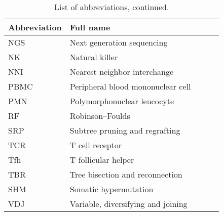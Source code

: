 \vfill

\begin{table}[!ht]
\begin{tabular}{l*{3}{l}r}
	 \textbf{Abbreviation} & \textbf{Full name} \\
	\hline
	NGS & Next generation sequencing \\
	NK & Natural killer \\
	NNI & Nearest neighbor interchange \\
	PBMC & Peripheral blood mononuclear cell \\
	PMN & Polymorphonuclear leucocyte \\
	RF & Robinson–Foulds \\
	SRP & Subtree pruning and regrafting \\
	TCR & T cell receptor \\
	Tfh & T follicular helper \\
	TBR & Tree bisection and reconnection \\
	SHM & Somatic hypermutation \\
	VDJ & Variable, diversifying and joining \\
	\hline
\end{tabular}
\caption{List of abbreviations, continued.}
\end{table}

\vfill


\clearpage
\newpage